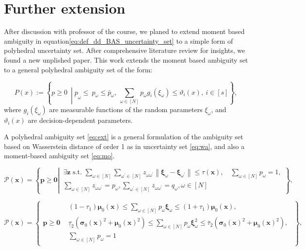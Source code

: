 \documentclass[12pt, letterpaper]{article}
\begin{document}
	\section{Further extension}
	
	After discussion with professor of the course, we planed to extend moment based ambiguity in equation\ref{eq:def_dd_BAS_uncertainty_set} to a simple form of polyhedral uncertainty set. After comprehensive literature review for insights, we found \cite{rahimiandistributionally} a new unplished paper. This work extends the moment based ambiguity set to a general polyhedral ambiguity set of the form:
	
	\begin{equation}\label{eq:ext}
		P(x) := \left\{ p \geq 0 \ \middle| \underbar{p}_\omega \leq \ p_\omega \leq \bar{p}_\omega, \ \sum_{\omega \in [N]} p_\omega g_i(\xi_\omega) \leq \vartheta_i(x), \ i \in [s] \right\},
		\end{equation}
		where $g_i(\xi_\omega)$ are measurable functions of the random parameters $\xi_\omega$, and $\vartheta_i(x)$ are decision-dependent parameters.
	
		A polyhedral ambiguity set \ref{eq:ext} is a general formulation of the ambiguity set based on Wasserstein distance of order 1 as in uncertainty set \ref{eq:wa}, and also a moment-based ambiguity set \ref{eq:mo}.
	
		\begin{equation}\label{eq:wa}
			\mathcal{P}(\boldsymbol{x})=\left\{\boldsymbol{p} \geq \mathbf{0} \left\lvert\, \begin{array}{l|l}
			\exists \boldsymbol{z} \text { s.t. } \sum_{\omega \in[N]} \sum_{\omega^{\prime} \in[N]} z_{\omega \omega^{\prime}}\left\|\boldsymbol{\xi}_\omega-\boldsymbol{\xi}_{\omega^{\prime}}\right\| \leq \tau(\boldsymbol{x}), \quad \sum_{\omega \in[N]} p_\omega=1, \\
			\sum_{\omega \in[N]} z_{\omega \omega^{\prime}}=p_\omega, \sum_{\omega^{\prime} \in[N]} z_{\omega \omega^{\prime}}=q_\omega, \omega \in[N]
		\end{array}\right.\right\},
		\end{equation}

		\begin{equation}\label{eq:mo}
			\mathcal{P}(\boldsymbol{x})=\left\{\begin{array}{l|l}
			\boldsymbol{p} \geq \mathbf{0} & \begin{array}{l}
			\left(1-\tau_1\right) \boldsymbol{\mu}_0(\boldsymbol{x}) \leq \sum_{\omega \in[N]} p_\omega \boldsymbol{\xi}_\omega \leq\left(1+\tau_1\right) \boldsymbol{\mu}_0(\boldsymbol{x}), \\
			\underline{\tau}_2\left(\boldsymbol{\sigma}_0(\boldsymbol{x})^2+\boldsymbol{\mu}_0(\boldsymbol{x})^2\right) \leq \sum_{\omega \in[N]} p_\omega \boldsymbol{\xi}_\omega^2 \leq \bar{\tau}_2\left(\boldsymbol{\sigma}_0(\boldsymbol{x})^2+\boldsymbol{\mu}_0(\boldsymbol{x})^2\right), \\
			\sum_{\omega \in[N]} p_\omega=1
			\end{array}
			\end{array}\right\},
			\end{equation}
\end{document}
